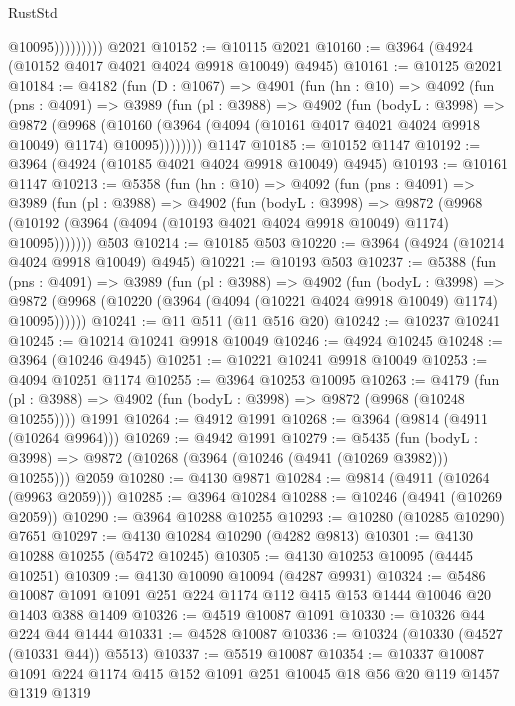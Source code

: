 \begin{lexlean}{RustStd}
\begin{coremodule}
                      @10095)))))))))
    @2021
@10152 := @10115 @2021
@10160 := @3964 (@4924 (@10152 @4017 @4021 @4024 @9918 @10049) @4945)
@10161 := @10125 @2021
@10184 := @4182
    (fun (D : @1067) =>
    @4901
      (fun (hn : @10) =>
      @4092
        (fun (pns : @4091) =>
        @3989
          (fun (pl : @3988) =>
          @4902
            (fun (bodyL : @3998) =>
            @9872
              (@9968
                (@10160 (@3964 (@4094 (@10161 @4017 @4021 @4024 @9918 @10049) @1174) @10095))))))))
    @1147
@10185 := @10152 @1147
@10192 := @3964 (@4924 (@10185 @4021 @4024 @9918 @10049) @4945)
@10193 := @10161 @1147
@10213 := @5358
    (fun (hn : @10) =>
    @4092
      (fun (pns : @4091) =>
      @3989
        (fun (pl : @3988) =>
        @4902
          (fun (bodyL : @3998) =>
          @9872 (@9968 (@10192 (@3964 (@4094 (@10193 @4021 @4024 @9918 @10049) @1174) @10095)))))))
    @503
@10214 := @10185 @503
@10220 := @3964 (@4924 (@10214 @4024 @9918 @10049) @4945)
@10221 := @10193 @503
@10237 := @5388
    (fun (pns : @4091) =>
    @3989
      (fun (pl : @3988) =>
      @4902
        (fun (bodyL : @3998) =>
        @9872 (@9968 (@10220 (@3964 (@4094 (@10221 @4024 @9918 @10049) @1174) @10095))))))
@10241 := @11 @511 (@11 @516 @20)
@10242 := @10237 @10241
@10245 := @10214 @10241 @9918 @10049
@10246 := @4924 @10245
@10248 := @3964 (@10246 @4945)
@10251 := @10221 @10241 @9918 @10049
@10253 := @4094 @10251 @1174
@10255 := @3964 @10253 @10095
@10263 := @4179
    (fun (pl : @3988) => @4902 (fun (bodyL : @3998) => @9872 (@9968 (@10248 @10255))))
    @1991
@10264 := @4912 @1991
@10268 := @3964 (@9814 (@4911 (@10264 @9964)))
@10269 := @4942 @1991
@10279 := @5435
    (fun (bodyL : @3998) => @9872 (@10268 (@3964 (@10246 (@4941 (@10269 @3982))) @10255)))
    @2059
@10280 := @4130 @9871
@10284 := @9814 (@4911 (@10264 (@9963 @2059)))
@10285 := @3964 @10284
@10288 := @10246 (@4941 (@10269 @2059))
@10290 := @3964 @10288 @10255
@10293 := @10280 (@10285 @10290) @7651
@10297 := @4130 @10284 @10290 (@4282 @9813)
@10301 := @4130 @10288 @10255 (@5472 @10245)
@10305 := @4130 @10253 @10095 (@4445 @10251)
@10309 := @4130 @10090 @10094 (@4287 @9931)
@10324 := @5486 @10087 @1091 @1091 @251 @224 @1174 @112 @415 @153 @1444 @10046 @20 @1403 @388 @1409
@10326 := @4519 @10087 @1091
@10330 := @10326 @44 @224 @44 @1444
@10331 := @4528 @10087
@10336 := @10324 (@10330 (@4527 (@10331 @44)) @5513)
@10337 := @5519 @10087
@10354 := @10337
    @10087
    @1091
    @224
    @1174
    @415
    @152
    @1091
    @251
    @10045
    @18
    @56
    @20
    @119
    @1457
    @1319
    @1319

\end{coremodule}
\end{lexlean}
